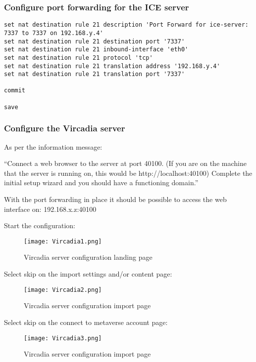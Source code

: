 \hypertarget{configure-port-forwarding-for-the-ice-server}{%
\subsubsection{Configure port forwarding for the ICE
server}\label{configure-port-forwarding-for-the-ice-server}}

\begin{verbatim}
set nat destination rule 21 description 'Port Forward for ice-server: 7337 to 7337 on 192.168.y.4'
set nat destination rule 21 destination port '7337'
set nat destination rule 21 inbound-interface 'eth0'
set nat destination rule 21 protocol 'tcp'
set nat destination rule 21 translation address '192.168.y.4'
set nat destination rule 21 translation port '7337'

commit

save
\end{verbatim}

\hypertarget{configure-the-vircadia-server}{%
\subsubsection{Configure the Vircadia
server}\label{configure-the-vircadia-server}}

As per the information message:

``Connect a web browser to the server at port 40100. (If you are on the
machine that the server is running on, this would be
http://localhost:40100) Complete the initial setup wizard and you should
have a functioning domain.''

With the port forwarding in place it should be possible to access the
web interface on: 192.168.x.z:40100

Start the configuration:

\begin{figure}
\centering
\texttt{[image: Vircadia1.png]}
\caption{Vircadia server configuration landing page}
\end{figure}

Select skip on the import settings and/or content page:

\begin{figure}
\centering
\texttt{[image: Vircadia2.png]}
\caption{Vircadia server configuration import page}
\end{figure}

Select skip on the connect to metaverse account page:

\begin{figure}
\centering
\texttt{[image: Vircadia3.png]}
\caption{Vircadia server configuration import page}
\end{figure}

